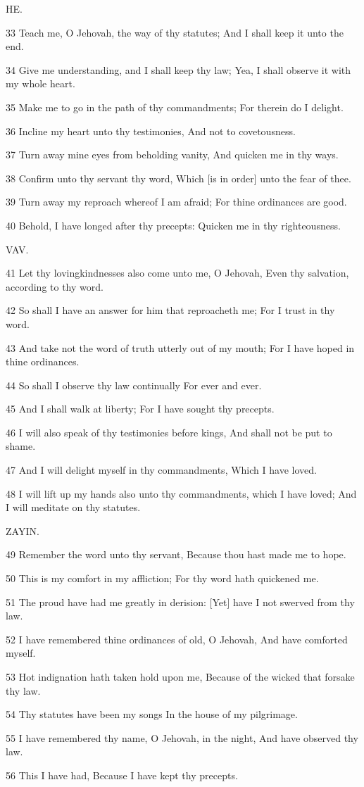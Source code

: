 \par HE.

\par 33 Teach me, O Jehovah, the way of thy statutes; And I shall keep it unto the end.
\par 34 Give me understanding, and I shall keep thy law; Yea, I shall observe it with my whole heart.
\par 35 Make me to go in the path of thy commandments; For therein do I delight.
\par 36 Incline my heart unto thy testimonies, And not to covetousness.
\par 37 Turn away mine eyes from beholding vanity, And quicken me in thy ways.
\par 38 Confirm unto thy servant thy word, Which [is in order] unto the fear of thee.
\par 39 Turn away my reproach whereof I am afraid; For thine ordinances are good.
\par 40 Behold, I have longed after thy precepts: Quicken me in thy righteousness.

\par VAV.

\par 41 Let thy lovingkindnesses also come unto me, O Jehovah, Even thy salvation, according to thy word.
\par 42 So shall I have an answer for him that reproacheth me; For I trust in thy word.
\par 43 And take not the word of truth utterly out of my mouth; For I have hoped in thine ordinances.
\par 44 So shall I observe thy law continually For ever and ever.
\par 45 And I shall walk at liberty; For I have sought thy precepts.
\par 46 I will also speak of thy testimonies before kings, And shall not be put to shame.
\par 47 And I will delight myself in thy commandments, Which I have loved.
\par 48 I will lift up my hands also unto thy commandments, which I have loved; And I will meditate on thy statutes.

\par ZAYIN.

\par 49 Remember the word unto thy servant, Because thou hast made me to hope.
\par 50 This is my comfort in my affliction; For thy word hath quickened me.
\par 51 The proud have had me greatly in derision: [Yet] have I not swerved from thy law.
\par 52 I have remembered thine ordinances of old, O Jehovah, And have comforted myself.
\par 53 Hot indignation hath taken hold upon me, Because of the wicked that forsake thy law.
\par 54 Thy statutes have been my songs In the house of my pilgrimage.
\par 55 I have remembered thy name, O Jehovah, in the night, And have observed thy law.
\par 56 This I have had, Because I have kept thy precepts.

